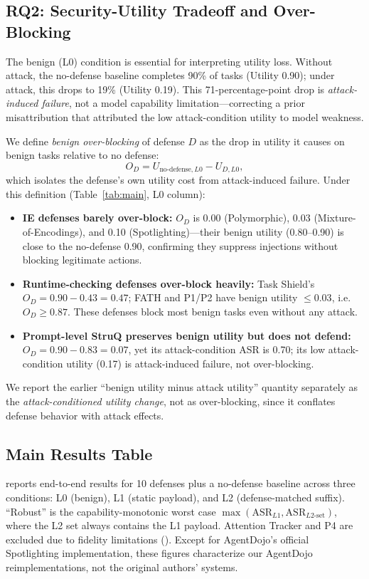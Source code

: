\subsection{RQ2: Security-Utility Tradeoff and Over-Blocking}

The benign (L0) condition is essential for interpreting utility loss. Without attack, the no-defense baseline completes 90\% of tasks (Utility 0.90); under attack, this drops to 19\% (Utility 0.19). This 71-percentage-point drop is \emph{attack-induced failure}, not a model capability limitation---correcting a prior misattribution that attributed the low attack-condition utility to model weakness.

We define \emph{benign over-blocking} of defense $D$ as the drop in utility it causes on benign tasks relative to no defense:
\[
O_D = U_{\text{no-defense},L0} - U_{D,L0},
\]
which isolates the defense's own utility cost from attack-induced failure. Under this definition (Table~\ref{tab:main}, L0 column):

\begin{itemize}[noitemsep,topsep=0pt]
\item \textbf{IE defenses barely over-block:} $O_D$ is 0.00 (Polymorphic), 0.03 (Mixture-of-Encodings), and 0.10 (Spotlighting)---their benign utility (0.80--0.90) is close to the no-defense 0.90, confirming they suppress injections without blocking legitimate actions.
\item \textbf{Runtime-checking defenses over-block heavily:} Task Shield's $O_D = 0.90 - 0.43 = 0.47$; FATH and P1/P2 have benign utility $\leq 0.03$, i.e.\ $O_D \geq 0.87$. These defenses block most benign tasks even without any attack.
\item \textbf{Prompt-level StruQ preserves benign utility but does not defend:} $O_D = 0.90 - 0.83 = 0.07$, yet its attack-condition ASR is 0.70; its low attack-condition utility (0.17) is attack-induced failure, not over-blocking.
\end{itemize}

We report the earlier ``benign utility minus attack utility'' quantity separately as the \emph{attack-conditioned utility change}, not as over-blocking, since it conflates defense behavior with attack effects.

\subsection{Main Results Table}

 reports end-to-end results for 10 defenses plus a no-defense baseline across three conditions: L0 (benign), L1 (static payload), and L2 (defense-matched suffix). ``Robust'' is the capability-monotonic worst case $\max(\mathrm{ASR}_{L1},\mathrm{ASR}_{L2\text{-set}})$, where the L2 set always contains the L1 payload. Attention Tracker and P4 are excluded due to fidelity limitations (). Except for AgentDojo's official Spotlighting implementation, these figures characterize our AgentDojo reimplementations, not the original authors' systems.

